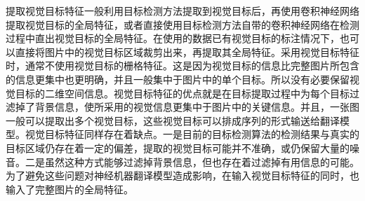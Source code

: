 提取视觉目标特征一般利用目标检测方法提取到视觉目标后，再使用卷积神经网络提取视觉目标的全局特征，或者直接使用目标检测方法自带的卷积神经网络在检测过程中直出视觉目标的全局特征。在使用的数据已有视觉目标的标注情况下，也可以直接将图片中的视觉目标区域裁剪出来，再提取其全局特征。采用视觉目标特征时，通常不使用视觉目标的栅格特征。这是因为视觉目标的信息比完整图片所包含的信息更集中也更明确，并且一般集中于图片中的单个目标。所以没有必要保留视觉目标的二维空间信息。视觉目标特征的优点就是在目标提取过程中为每个目标过滤掉了背景信息，使所采用的视觉信息更集中于图片中的关键信息。并且，一张图一般可以提取出多个视觉目标，这些视觉目标可以排成序列的形式输送给翻译模型。视觉目标特征同样存在着缺点。一是目前的目标检测算法的检测结果与真实的目标区域仍存在着一定的偏差，提取的视觉目标可能并不准确，或仍保留大量的噪音。二是虽然这种方式能够过滤掉背景信息，但也存在着过滤掉有用信息的可能。为了避免这些问题对神经机器翻译模型造成影响，在输入视觉目标特征的同时，也输入了完整图片的全局特征。









